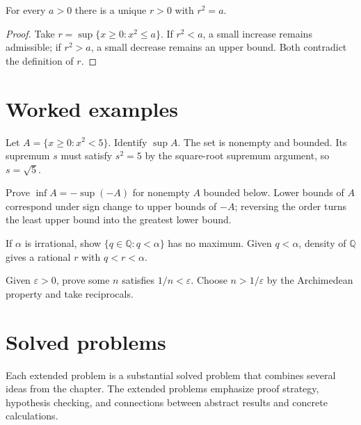 \begin{theorem}\label{thm:ii01-03}
For every $a>0$ there is a unique $r>0$ with $r^2=a$.
\begin{proof}
Take $r=\sup\{x\ge0:x^2\le a\}$. If $r^2<a$, a small increase remains admissible; if $r^2>a$, a small decrease remains an upper bound. Both contradict the definition of $r$.
\end{proof}
\end{theorem}

\section{Worked examples}

\begin{example}\label{ex:ii01-worked-01}
Let $A=\{x\ge0:x^2<5\}$. Identify $\sup A$. The set is nonempty and bounded. Its supremum $s$ must satisfy $s^2=5$ by the square-root supremum argument, so $s=\sqrt5$.
\end{example}

\begin{example}\label{ex:ii01-worked-02}
Prove $\inf A=-\sup(-A)$ for nonempty $A$ bounded below. Lower bounds of $A$ correspond under sign change to upper bounds of $-A$; reversing the order turns the least upper bound into the greatest lower bound.
\end{example}

\begin{example}\label{ex:ii01-worked-03}
If $\alpha$ is irrational, show $\{q\in\mathbb Q:q<\alpha\}$ has no maximum. Given $q<\alpha$, density of $\mathbb Q$ gives a rational $r$ with $q<r<\alpha$.
\end{example}

\begin{example}\label{ex:ii01-worked-04}
Given $\varepsilon>0$, prove some $n$ satisfies $1/n<\varepsilon$. Choose $n>1/\varepsilon$ by the Archimedean property and take reciprocals.
\end{example}

\section{Solved problems}
Each extended problem is a substantial solved problem that combines several ideas from the chapter. The extended problems emphasize proof strategy, hypothesis checking, and connections between abstract results and concrete calculations.

